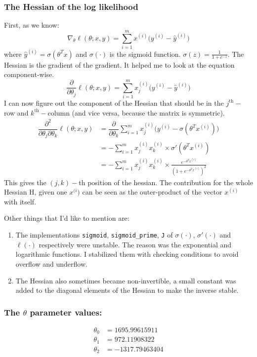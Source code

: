 \documentclass[11pt]{article}
\begin{document}
\subsubsection{The Hessian of the log likelihood}
\label{sec:org52789f5}
First, as we know:
\begin{equation*}
\nabla_\theta\ell(\theta;x,y)=\sum_{i=1}^m x^{(i)}\bigl(y^{(i)} - \hat{y}^{(i)}\bigr)
\end{equation*}
where \(\hat{y}^{(i)}=\sigma(\theta^Tx)\) and \(\sigma(\cdot)\) is the
sigmoid
function. \(\displaystyle\sigma(z)=\frac{1}{1+e^{-z}}\). The
Hessian is the gradient of the gradient. It helped me to look at the
equation component-wise.
\begin{equation*}
\dfrac{\partial}{\partial\theta_j}\ell(\theta;x,y)=\sum_{i=1}^m x_j^{(i)}\bigl(y^{(i)} - \hat{y}^{(i)}\bigr)
\end{equation*}
I can now figure out the component of the Hessian that should be in the
\(j^{\mathrm{th}}-\)row and \(k^{\mathrm{th}}-\)column (and vice versa,
because the matrix is symmetric).
\begin{align*}
\dfrac{\partial^2}{\partial\theta_j\partial\theta_k}\ell(\theta;x,y)&=\dfrac{\partial}{\partial\theta_k}\sum_{i=1}^m x_j^{(i)}\bigl(y^{(i)} - \sigma(\theta^Tx^{(i)})\bigr)\\
&=-\sum_{i=1}^m x_j^{(i)}x_k^{(i)}\times\sigma'(\theta^Tx^{(i)})\\
&=-\sum_{i=1}^m x_j^{(i)}x_k^{(i)}\times\frac{e^{-\theta^Tx^{(i)}}}{(1+e^{-\theta^Tx^{(i)}})^2}
\end{align*}
This gives the \((j,k)-\)th position of the hessian. The contribution
for the whole Hessian H, given one \(x^{(i})\) can be seen as the
outer-product of the vector \(x^{(i)}\) with itself.\par
Other things that I'd like to mention are:
\begin{enumerate}
\item The implementations \texttt{sigmoid}, \texttt{sigmoid\_prime},
\texttt{J} of \(\sigma(\cdot)\), \(\sigma'(\cdot)\) and
\(\ell(\cdot)\) respectively were unstable. The reason was the
exponential and logarithmic functions. I stabilized them
with checking conditions to avoid overflow and underflow.
\item The Hessian also sometimes became non-invertible, a small
constant was added to the diagonal elements of the Hessian to
make the inverse stable.
\end{enumerate}
\subsubsection{The \(\theta\) parameter values:}
\label{sec:org3f62dae}
\begin{align*}
\theta_0 &=1695.99615911\\
\theta_1 &=972.11908322\\
\theta_2 &=-1317.79463404
\end{align*}
\end{document}
